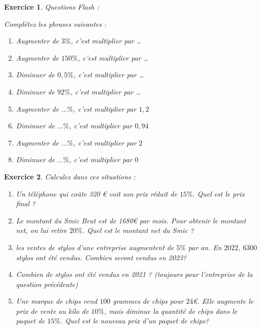 \documentclass[10pt,a4paper]{article}
\newtheorem{exo}{Exercice}
\begin{document}
\begin{exo} Questions Flash : 
\item Complétez les phrases suivantes :
    \begin{enumerate}
        \item Augmenter de $3\%$, c'est multiplier par \ldots
        \item Augmenter de $150\%$, c'est multiplier par \ldots
        \item Diminuer de $0{,}5\%$, c'est multiplier par \ldots
        \item Diminuer de $92\%$, c'est multiplier par \ldots
        \item Augmenter de $\ldots\%$, c'est multiplier par $1{,}2$
        \item Diminuer de $\ldots\%$, c'est multiplier par $0{,}94$
        \item Augmenter de $\ldots\%$, c'est multiplier par $2$
        \item Diminuer de $\ldots \%$, c'est multiplier par $0$
    \end{enumerate}
\end{exo}

\begin{exo}
 Calculez dans ces situations :
    \begin{enumerate}
        \item Un téléphone qui coûte 320 € voit son prix réduit de $15\%$. Quel est le prix final ?
        \item Le montant du Smic Brut est de 1680€ par mois. Pour obtenir le montant net, on lui retire $20\%$. Quel est le montant net du Smic ?
        \item les ventes de stylos d'une entreprise augmentent de $5\%$ par an. En $2022$, $6300$ stylos ont été vendus. Combien seront vendus en 2023?
        \item Combien de stylos ont été vendus en 2021 ? (toujours pour l'entreprise de la question précédente)
        \item Une marque de chips vend $100$ grammes de chips pour $24$€. Elle augmente le prix de vente au kilo de $10\%$, mais diminue la quantité de chips dans le paquet de $15\%$. Quel est le nouveau prix d'un paquet de chips?
    \end{enumerate}
\end{exo}
\end{document}
